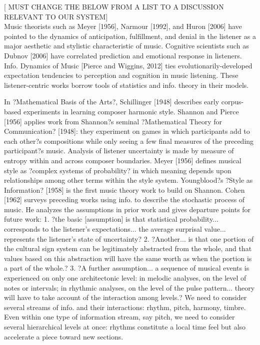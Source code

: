 \documentclass[final,authoryear,11pt,times]{elsarticle}
\begin{document}
[ MUST CHANGE THE BELOW FROM A LIST TO A DISCUSSION RELEVANT TO OUR SYSTEM]\\

Music theorists such as Meyer [1956], Narmour [1992], and Huron [2006] have pointed to the dynamics of anticipation, fulfillment, and denial in the listener as a major aesthetic and stylistic characteristic of music. Cognitive scientists such as Dubnov [2006] have correlated prediction and emotional response in listeners. Info. Dynamics of Music [Pierce and Wiggins, 2012] ties evolutionarily-developed expectation tendencies to perception and cognition in music listening. These listener-centric works borrow tools of statistics and info. theory in their models. 

In ?Mathematical Basis of the Arts?, Schillinger [1948] describes early corpus-based experiments in learning composer harmonic style. Shannon and Pierce [1956] applies work from Shannon?s seminal ?Mathematical Theory for Communication? [1948]: they experiment on games in which participants add to each other?s compositions while only seeing a few final measures of the preceding participant?s music. Analysis of listener uncertainty is made by measure of entropy within and across composer boundaries. Meyer [1956] defines musical style as ?complex systems of probability? in which meaning depends upon relationships among other terms within the style system. Youngblood?s ?Style as Information? [1958] is the first music theory work to build on Shannon. Cohen [1962] surveys preceding works using info. to describe the stochastic process of music. He analyzes the assumptions in prior work and gives departure points for future work:
1. ?the basic [assumption] is that statistical probability... corresponds to the listener's expectations... the average surprisal value... represents the listener's state of uncertainty?
2. ?Another... is that one portion of the cultural sign system can be legitimately abstracted from the whole, and that values based on this abstraction will have the same worth as when the portion is a part of the whole.?
3. ?A further assumption... a sequence of musical events is experienced on only one architectonic level: in melodic analyses, on the level of notes or intervals; in rhythmic analyses, on the level of the pulse pattern... theory will have to take account of the interaction among levels.?
We need to consider several streams of info. and their interactions: rhythm, pitch, harmony, timbre. Even within one type of information stream, say pitch, we need to consider several hierarchical levels at once: rhythms constitute a local time feel but also accelerate a piece toward new sections.
\end{document}
